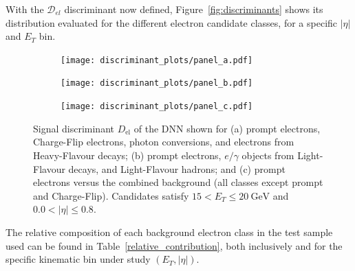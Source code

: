 With the $ \mathcal{D}_{el} $ discriminant now defined, Figure~\ref{fig:discriminants} shows its distribution evaluated for the different electron candidate classes, for a specific $|\eta|$ and $E_{T}$ bin.
\begin{figure}[htbp]
  \centering
  \begin{subfigure}[t]{0.48\linewidth}
    \centering
    \texttt{[image: discriminant\_plots/panel\_a.pdf]}
    \caption{}
    \label{fig:dnnDisc_a}
  \end{subfigure}\hfill
  \begin{subfigure}[t]{0.48\linewidth}
    \centering
    \texttt{[image: discriminant\_plots/panel\_b.pdf]}
    \caption{}
    \label{fig:dnnDisc_b}
  \end{subfigure}

  \vspace{0.35cm}

  \begin{subfigure}[t]{0.60\linewidth}
    \centering
    \texttt{[image: discriminant\_plots/panel\_c.pdf]}
    \caption{}
    \label{fig:dnnDisc_c}
  \end{subfigure}

  \caption{Signal discriminant $D_{\mathrm{el}}$ of the DNN shown for (a) prompt electrons,
  Charge-Flip electrons, photon conversions, and electrons from Heavy-Flavour decays;
  (b) prompt electrons, $e/\gamma$ objects from Light-Flavour decays, and Light-Flavour hadrons;
  and (c) prompt electrons versus the combined background (all classes except prompt and Charge-Flip).
  Candidates satisfy $15<E_{T}\leq 20~\mathrm{GeV}$ and $0.0<|\eta|\leq 0.8$.}
  \label{fig:dnn_final_disc}
\end{figure}
The relative composition of each background electron class in the test sample used can be found in Table~\ref{relative_contribution}, both inclusively and for the specific kinematic bin under study $(E_{T},|\eta|)$.

